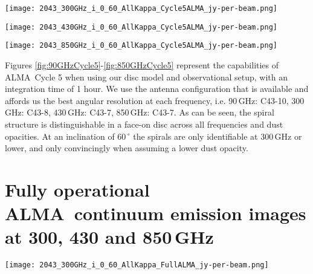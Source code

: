\documentclass[fleqn,usenatbib]{mnras}
\newcommand{\alma}{ALMA}
\begin{document}
\begin{figure*}
    \texttt{[image: 2043\_300GHz\_i\_0\_60\_AllKappa\_Cycle5ALMA\_jy-per-beam.png]}
    \caption{Same as Figure \ref{fig:90GHzCycle5} but synthesised at 300\,GHz with a beamsize of 0.033$\,\times\,$0.031\,arcsec and a noise level of approximately 26\,\textmu Jy per beam.}
    \label{fig:300GHzCycle5}
\end{figure*}

\begin{figure*}
    \texttt{[image: 2043\_430GHz\_i\_0\_60\_AllKappa\_Cycle5ALMA\_jy-per-beam.png]}
    \caption{Same as Figure \ref{fig:90GHzCycle5} but synthesised at 430\,GHz with a beamsize of 0.052$\,\times\,$0.045\,arcsec and a noise level of approximately 115\,\textmu Jy per beam.}
    \label{fig:430GHzCycle5}
\end{figure*}

\begin{figure*}
    \texttt{[image: 2043\_850GHz\_i\_0\_60\_AllKappa\_Cycle5ALMA\_jy-per-beam.png]}
    \caption{Same as Figure \ref{fig:90GHzCycle5} but synthesised at 850\,GHz with a beamsize of 0.027$\,\times\,$0.023\,arcsec and a noise level of approximately 110\,\textmu Jy per beam.}
    \label{fig:850GHzCycle5}
\end{figure*}

Figures \ref{fig:90GHzCycle5}-\ref{fig:850GHzCycle5} represent the capabilities of \alma\ Cycle 5 when using our disc model and observational setup, with an integration time of 1 hour. We use the antenna configuration that is available and affords us the best angular resolution at each frequency, i.e. 90\,GHz: C43-10, 300\,GHz: C43-8, 430\,GHz: C43-7, 850\,GHz: C43-7. As can be seen, the spiral structure is distinguishable in a face-on disc across all frequencies and dust opacities. At an inclination of 60\,$^\circ$ the spirals are only identifiable at 300\,GHz or lower, and only convincingly when assuming a lower dust opacity.

\section[fullalma]{Fully operational \alma\ continuum emission images at 300, 430 and 850\,GHz} 
\label{sec:fullalma}

\begin{figure*}
    \texttt{[image: 2043\_300GHz\_i\_0\_60\_AllKappa\_FullALMA\_jy-per-beam.png]}
    \caption{Continuum emission images of our disc model at 300\,GHz for three different dust configurations and two different inclinations, synthesised using a fully extended, maximally operational \alma\ antenna configuration. The white ellipse in the lower left indicates the size of the beam, which is 0.014$\,\times\,$0.014\,arcsec and is constant across all panels. The noise is approximately 20\,\textmu Jy per beam across the parameter space.}
    \label{fig:300GHzFullALMA}
\end{figure*}
\end{document}
